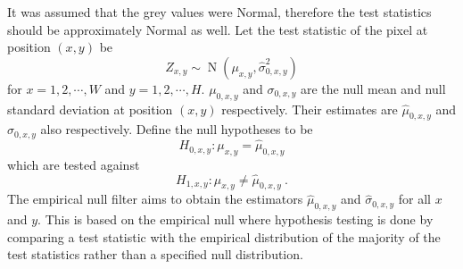 \documentclass{proc}
\DeclareMathOperator{\normal}{N}
\begin{document}
It was assumed that the grey values were Normal, therefore the test statistics should be approximately Normal as well. Let the test statistic of the pixel at position $(x,y)$ be
\begin{equation}
Z_{x,y}\sim\normal(\mu_{x,y},\widehat{\sigma}_{0,x,y}^2)
\end{equation}
for $x=1,2,\cdots,W$ and $y=1,2,\cdots,H$. $\mu_{0,x,y}$ and $\sigma_{0,x,y}$ are the null mean and null standard deviation at position $(x,y)$ respectively. Their estimates are $\widehat{\mu}_{0,x,y}$ and $\widehat{\sigma}_{0,x,y}$ also respectively. Define the null hypotheses to be
\begin{equation}
  H_{0,x,y}:\mu_{x,y}=\widehat{\mu}_{0,x,y}
\end{equation}
which are tested against
\begin{equation}
  H_{1,x,y}:\mu_{x,y}\neq\widehat{\mu}_{0,x,y} \ .
\end{equation}
The empirical null filter aims to obtain the estimators $\widehat{\mu}
_{0,x,y}$ and $\widehat{\sigma}_{0,x,y}$ for all $x$ and $y$. This is based on the empirical null \citep{efron2004large} where hypothesis testing is done by comparing a test statistic with the empirical distribution of the majority of the test statistics rather than a specified null distribution.
\end{document}
